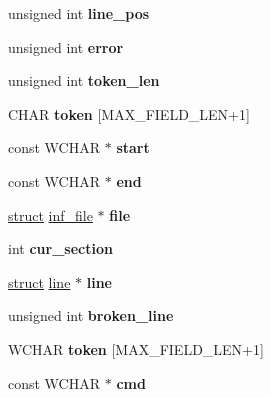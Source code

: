 \begin{DoxyCompactItemize}
unsigned int {\bfseries line\+\_\+pos}
\item 
\mbox{\label{structparser_ad20331ff4201786baee53ce38969ba2b}} 
unsigned int {\bfseries error}
\item 
\mbox{\label{structparser_aa3d85a471d5d359e71ae0c3408deae5f}} 
unsigned int {\bfseries token\+\_\+len}
\item 
\mbox{\label{structparser_a8135f7ff95ab9505cb101b60cf49d0ca}} 
C\+H\+AR {\bfseries token} \mbox{[}M\+A\+X\+\_\+\+F\+I\+E\+L\+D\+\_\+\+L\+EN+1\mbox{]}
\item 
\mbox{\label{structparser_a1408f3cef61944b510b013f8cdbc0200}} 
const W\+C\+H\+AR $\ast$ {\bfseries start}
\item 
\mbox{\label{structparser_a70c6754f5d634955920f8a07274ce63b}} 
const W\+C\+H\+AR $\ast$ {\bfseries end}
\item 
\mbox{\label{structparser_a40c00ab70ea3364a156b8f89a0d55b43}} 
\hyperlink{interfacestruct}{struct} \hyperlink{structinf__file}{inf\+\_\+file} $\ast$ {\bfseries file}
\item 
\mbox{\label{structparser_a3000d809e5e23501449a65ff0b2f3fb8}} 
int {\bfseries cur\+\_\+section}
\item 
\mbox{\label{structparser_a315a7a2d6fb050fd177cf6874c643016}} 
\hyperlink{interfacestruct}{struct} \hyperlink{structline}{line} $\ast$ {\bfseries line}
\item 
\mbox{\label{structparser_afd271cecdf92c39de9f381361990da20}} 
unsigned int {\bfseries broken\+\_\+line}
\item 
\mbox{\label{structparser_a749cfe516a71f6f506f586a02ef7ba1f}} 
W\+C\+H\+AR {\bfseries token} \mbox{[}M\+A\+X\+\_\+\+F\+I\+E\+L\+D\+\_\+\+L\+EN+1\mbox{]}
\item 
\mbox{\label{structparser_ae579205a74cb9de8548955b325b12e73}} 
const W\+C\+H\+AR $\ast$ {\bfseries cmd}
\item 
\mbox{\label{structparser_a8d15eb3cc5a5078d3aaf54b1c70b6870}} 

\end{DoxyCompactItemize}

